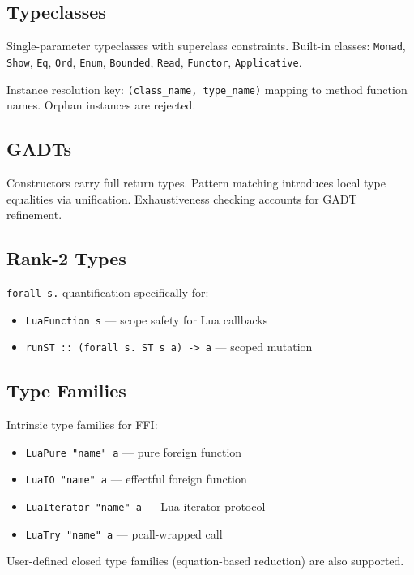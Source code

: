 \documentclass[11pt,a4paper]{article}
\begin{document}
\subsection{Typeclasses}

Single-parameter typeclasses with superclass constraints.  Built-in classes:
\texttt{Monad}, \texttt{Show}, \texttt{Eq}, \texttt{Ord}, \texttt{Enum},
\texttt{Bounded}, \texttt{Read}, \texttt{Functor}, \texttt{Applicative}.

Instance resolution key: \texttt{(class\_name, type\_name)} mapping to method
function names.  Orphan instances are rejected.

\subsection{GADTs}

Constructors carry full return types.  Pattern matching introduces local type
equalities via unification.  Exhaustiveness checking accounts for GADT
refinement.

\subsection{Rank-2 Types}

\texttt{forall s.} quantification specifically for:
\begin{itemize}[nosep]
  \item \texttt{LuaFunction s} --- scope safety for Lua callbacks
  \item \texttt{runST :: (forall s. ST s a) -> a} --- scoped mutation
\end{itemize}

\subsection{Type Families}

Intrinsic type families for FFI:
\begin{itemize}[nosep]
  \item \texttt{LuaPure "name" a} --- pure foreign function
  \item \texttt{LuaIO "name" a} --- effectful foreign function
  \item \texttt{LuaIterator "name" a} --- Lua iterator protocol
  \item \texttt{LuaTry "name" a} --- pcall-wrapped call
\end{itemize}

User-defined closed type families (equation-based reduction) are also supported.
\end{document}
